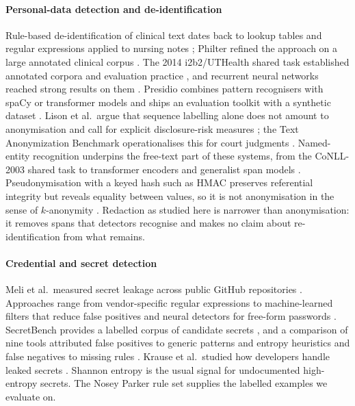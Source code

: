 \documentclass[pdflatex,sn-mathphys-num]{sn-jnl}
\theoremstyle{thmstyleone}
\theoremstyle{thmstylethree}
\begin{document}
\paragraph{Personal-data detection and de-identification}
Rule-based de-identification of clinical text dates back to lookup tables and regular expressions applied to nursing notes \cite{neamatullah2008deid}; Philter refined the approach on a large annotated clinical corpus \cite{norgeot2020philter}. The 2014 i2b2/UTHealth shared task established annotated corpora and evaluation practice \cite{stubbs2015annotating}, and recurrent neural networks reached strong results on them \cite{dernoncourt2017deid}. Presidio \cite{presidio} combines pattern recognisers with spaCy or transformer models and ships an evaluation toolkit with a synthetic dataset \cite{presidioresearch}. Lison et al.\ argue that sequence labelling alone does not amount to anonymisation and call for explicit disclosure-risk measures \cite{lison2021anonymisation}; the Text Anonymization Benchmark operationalises this for court judgments \cite{pilan2022tab}. Named-entity recognition underpins the free-text part of these systems, from the CoNLL-2003 shared task \cite{tjongkimsang2003conll} to transformer encoders \cite{devlin2019bert,sanh2019distilbert} and generalist span models \cite{zaratiana2024gliner}. Pseudonymisation with a keyed hash such as HMAC \cite{rfc2104} preserves referential integrity but reveals equality between values, so it is not anonymisation in the sense of $k$-anonymity \cite{sweeney2002kanonymity}. Redaction as studied here is narrower than anonymisation: it removes spans that detectors recognise and makes no claim about re-identification from what remains.

\paragraph{Credential and secret detection}
Meli et al.\ measured secret leakage across public GitHub repositories \cite{meli2019git}. Approaches range from vendor-specific regular expressions \cite{sinha2015secretkey} to machine-learned filters that reduce false positives \cite{saha2020secrets} and neural detectors for free-form passwords \cite{feng2022passfinder}. SecretBench provides a labelled corpus of candidate secrets \cite{basak2023secretbench}, and a comparison of nine tools attributed false positives to generic patterns and entropy heuristics and false negatives to missing rules \cite{basak2023comparative}. Krause et al.\ studied how developers handle leaked secrets \cite{krause2023pushed}. Shannon entropy \cite{shannon1948} is the usual signal for undocumented high-entropy secrets. The Nosey Parker rule set \cite{noseyparker} supplies the labelled examples we evaluate on.
\end{document}
